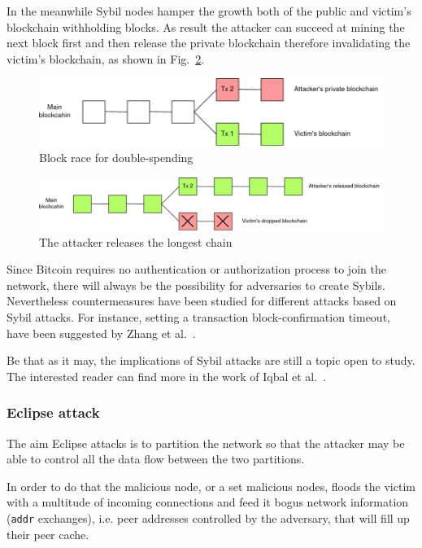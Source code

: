 \documentclass[12pt, letterpaper, twoside]{article}
\begin{document}
In the meanwhile Sybil nodes hamper the growth both of the public and victim's blockchain withholding blocks. As result the attacker can succeed at mining the next block first and then release the private blockchain therefore invalidating the victim's blockchain, as shown in Fig.~\ref{fig:race2}.

\begin{figure}[h!]
	\includegraphics[width=.9\textwidth]{pict/blockrace1.png}
	\centering
	\caption{Block race for double-spending}
	\label{fig:race1}
\end{figure}

\begin{figure}[h!]
	\includegraphics[width=.9\textwidth]{pict/blockrace2.png}
	\centering
	\caption{The attacker releases the longest chain}
	\label{fig:race2}
\end{figure}

Since Bitcoin requires no authentication or authorization process to join the network, there will always be the possibility for adversaries to create Sybils. Nevertheless countermeasures have been studied for different attacks based on Sybil attacks. For instance, setting a transaction block-confirmation timeout, have been suggested by Zhang et al.~\cite{zhang-sybil-mitigations}.

Be that as it may, the implications of Sybil attacks are still a topic open to study. The interested reader can find more in the work of Iqbal et al.~\cite{iqbal-sybil}.

\subsubsection{Eclipse attack}\label{sec:eclipse}
The aim Eclipse attacks is to partition the network so that the attacker may be able to control all the data flow between the two partitions.

In order to do that the malicious node, or a set malicious nodes, floods the victim with a multitude of incoming connections and feed it bogus network information (\texttt{addr} exchanges), i.e. peer addresses controlled by the adversary, that will fill up their peer cache.
\end{document}
